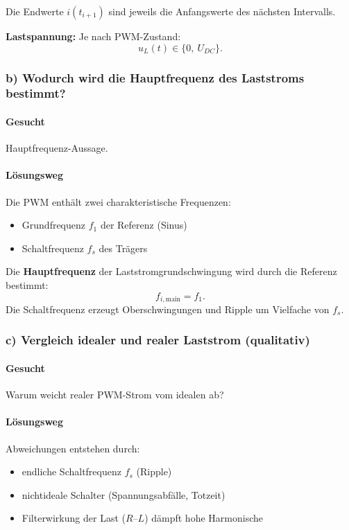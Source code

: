 Die Endwerte $i(t_{i+1})$ sind jeweils die Anfangswerte des nächsten Intervalls.

\textbf{Lastspannung:}
Je nach PWM-Zustand:
\[
\boxed{u_L(t)\in\{0,\ U_{DC}\}}.
\]


\subsubsection*{b) Wodurch wird die Hauptfrequenz des Laststroms bestimmt?}

\paragraph{Gesucht}
Hauptfrequenz-Aussage.

\paragraph{Lösungsweg}
Die PWM enthält zwei charakteristische Frequenzen:
\begin{itemize}
\item Grundfrequenz $f_1$ der Referenz (Sinus)
\item Schaltfrequenz $f_s$ des Trägers
\end{itemize}
Die \textbf{Hauptfrequenz} der Laststromgrundschwingung wird durch die Referenz bestimmt:
\[
\boxed{f_{i,\mathrm{main}}=f_1.}
\]
Die Schaltfrequenz erzeugt Oberschwingungen und Ripple um Vielfache von $f_s$.


\subsubsection*{c) Vergleich idealer und realer Laststrom (qualitativ)}

\paragraph{Gesucht}
Warum weicht realer PWM-Strom vom idealen ab?

\paragraph{Lösungsweg}
Abweichungen entstehen durch:
\begin{itemize}
\item endliche Schaltfrequenz $f_s$ (Ripple)
\item nichtideale Schalter (Spannungsabfälle, Totzeit)
\item Filterwirkung der Last ($R$--$L$) dämpft hohe Harmonische
\end{itemize}



